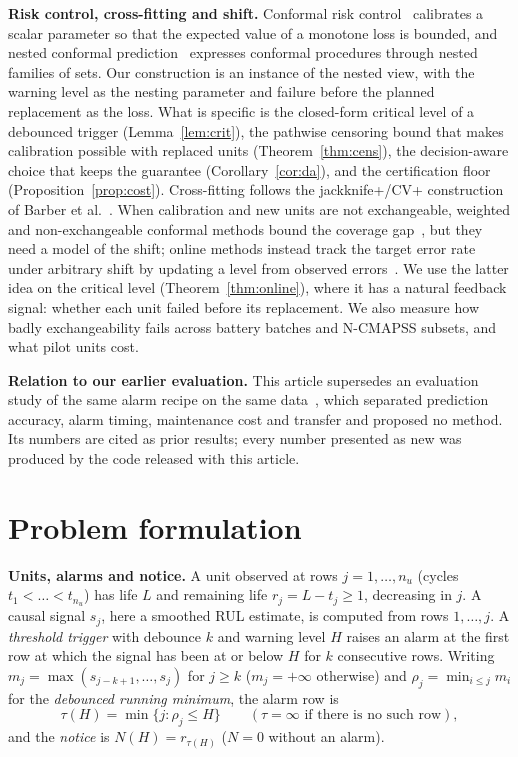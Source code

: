 \textbf{Risk control, cross-fitting and shift.} Conformal risk control~\cite{angelopoulos2024} calibrates a scalar parameter so that the expected value of a monotone loss is bounded, and nested conformal prediction~\cite{gupta2022} expresses conformal procedures through nested families of sets. Our construction is an instance of the nested view, with the warning level as the nesting parameter and failure before the planned replacement as the loss. What is specific is the closed-form critical level of a debounced trigger (Lemma~\ref{lem:crit}), the pathwise censoring bound that makes calibration possible with replaced units (Theorem~\ref{thm:cens}), the decision-aware choice that keeps the guarantee (Corollary~\ref{cor:da}), and the certification floor (Proposition~\ref{prop:cost}). Cross-fitting follows the jackknife+/CV+ construction of Barber et al.~\cite{barber2021}. When calibration and new units are not exchangeable, weighted and non-exchangeable conformal methods bound the coverage gap~\cite{tibshirani2019,barber2023}, but they need a model of the shift; online methods instead track the target error rate under arbitrary shift by updating a level from observed errors~\cite{gibbs2021,angelopoulos2023pid}. We use the latter idea on the critical level (Theorem~\ref{thm:online}), where it has a natural feedback signal: whether each unit failed before its replacement. We also measure how badly exchangeability fails across battery batches and N-CMAPSS subsets, and what pilot units cost.

\textbf{Relation to our earlier evaluation.} This article supersedes an evaluation study of the same alarm recipe on the same data~\cite{prior}, which separated prediction accuracy, alarm timing, maintenance cost and transfer and proposed no method. Its numbers are cited as prior results; every number presented as new was produced by the code released with this article.

\section{Problem formulation}\label{sec:problem}

\textbf{Units, alarms and notice.} A unit observed at rows $j=1,\dots,n_u$ (cycles $t_1<\dots<t_{n_u}$) has life $L$ and remaining life $r_j=L-t_j\ge1$, decreasing in $j$. A causal signal $s_j$, here a smoothed RUL estimate, is computed from rows $1,\dots,j$. A \emph{threshold trigger} with debounce $k$ and warning level $H$ raises an alarm at the first row at which the signal has been at or below $H$ for $k$ consecutive rows. Writing $m_j=\max(s_{j-k+1},\dots,s_j)$ for $j\ge k$ ($m_j=+\infty$ otherwise) and $\rho_j=\min_{i\le j}m_i$ for the \emph{debounced running minimum}, the alarm row is
\[
\tau(H)=\min\{j:\rho_j\le H\}\qquad(\tau=\infty\text{ if there is no such row}),
\]
and the \emph{notice} is $N(H)=r_{\tau(H)}$ ($N=0$ without an alarm).

